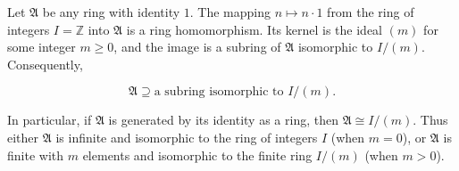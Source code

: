 Let $\mathfrak{A}$ be any ring with identity $1$. The mapping $n \mapsto n \cdot 1$ from the ring of integers $I = \mathbb{Z}$ into $\mathfrak{A}$ is a ring homomorphism. Its kernel is the ideal $(m)$ for some integer $m \geq 0$, and the image is a subring of $\mathfrak{A}$ isomorphic to $I/(m)$. Consequently,

$$\mathfrak{A} \supseteq \text{a subring isomorphic to } I/(m).$$

In particular, if $\mathfrak{A}$ is generated by its identity as a ring, then $\mathfrak{A} \cong I/(m)$. Thus either $\mathfrak{A}$ is infinite and isomorphic to the ring of integers $I$ (when $m = 0$), or $\mathfrak{A}$ is finite with $m$ elements and isomorphic to the finite ring $I/(m)$ (when $m > 0$).
